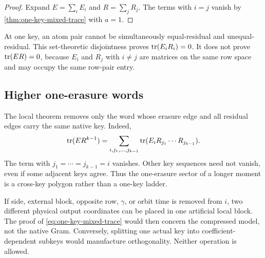 \begin{proof}
Expand \(E=\sum_iE_i\) and \(R=\sum_jR_j\).  The terms with \(i=j\)
vanish by \cref{thm:one-key-mixed-trace} with \(a=1\).
\end{proof}

\begin{remark}
\label{rem:not-HS-orthogonal}
At one key, an atom pair cannot be simultaneously equal-residual and
unequal-residual.  This set-theoretic disjointness proves
\(\operatorname{tr}(E_iR_i)=0\).  It does not prove \(\operatorname{tr}(ER)=0\), because \(E_i\) and
\(R_j\) with \(i\ne j\) are matrices on the same row space and may occupy
the same row-pair entry.
\end{remark}

\subsection{Higher one-erasure words}

The local theorem removes only the word whose erasure edge and all residual
edges carry the same native key.  Indeed,
\begin{equation}
 \operatorname{tr}(ER^{k-1})
 =
 \sum_{i,j_1,\ldots,j_{k-1}}
 \operatorname{tr}(E_iR_{j_1}\cdots R_{j_{k-1}}).
 \label{eq:key-expansion-one-erasure}
\end{equation}
The term with \(j_1=\cdots=j_{k-1}=i\) vanishes.  Other key sequences need
not vanish, even if some adjacent keys agree.  Thus the one-erasure sector
of a longer moment is a cross-key polygon rather than a one-key ladder.

\begin{remark}
If side, external block, opposite row, \(\gamma\), or orbit time is removed
from \(i\), two different physical output coordinates can be placed in one
artificial local block.  The proof of
\eqref{eq:one-key-mixed-trace} would then concern the compressed model, not
the native Gram.  Conversely, splitting one actual key into coefficient-
dependent subkeys would manufacture orthogonality.  Neither operation is
allowed.
\end{remark}
